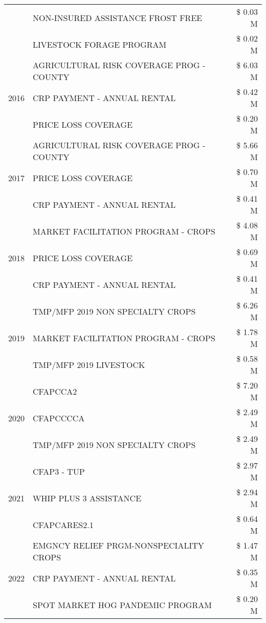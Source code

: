 \begin{tabular}{llr}
 & NON-INSURED ASSISTANCE FROST FREE & \$ 0.03 M \\
 & LIVESTOCK FORAGE PROGRAM & \$ 0.02 M \\
\cline{1-3}
\multirow[t]{3}{*}{2016} & AGRICULTURAL RISK COVERAGE PROG - COUNTY & \$ 6.03 M \\
 & CRP PAYMENT - ANNUAL RENTAL & \$ 0.42 M \\
 & PRICE LOSS COVERAGE & \$ 0.20 M \\
\cline{1-3}
\multirow[t]{3}{*}{2017} & AGRICULTURAL RISK COVERAGE PROG - COUNTY & \$ 5.66 M \\
 & PRICE LOSS COVERAGE & \$ 0.70 M \\
 & CRP PAYMENT - ANNUAL RENTAL & \$ 0.41 M \\
\cline{1-3}
\multirow[t]{3}{*}{2018} & MARKET FACILITATION PROGRAM - CROPS & \$ 4.08 M \\
 & PRICE LOSS COVERAGE & \$ 0.69 M \\
 & CRP PAYMENT - ANNUAL RENTAL & \$ 0.41 M \\
\cline{1-3}
\multirow[t]{3}{*}{2019} & TMP/MFP 2019 NON SPECIALTY CROPS & \$ 6.26 M \\
 & MARKET FACILITATION PROGRAM - CROPS & \$ 1.78 M \\
 & TMP/MFP 2019 LIVESTOCK & \$ 0.58 M \\
\cline{1-3}
\multirow[t]{3}{*}{2020} & CFAPCCA2 & \$ 7.20 M \\
 & CFAPCCCCA & \$ 2.49 M \\
 & TMP/MFP 2019 NON SPECIALTY CROPS & \$ 2.49 M \\
\cline{1-3}
\multirow[t]{3}{*}{2021} & CFAP3 - TUP & \$ 2.97 M \\
 & WHIP PLUS 3 ASSISTANCE & \$ 2.94 M \\
 & CFAPCARES2.1 & \$ 0.64 M \\
\cline{1-3}
\multirow[t]{3}{*}{2022} & EMGNCY RELIEF PRGM-NONSPECIALITY CROPS & \$ 1.47 M \\
 & CRP PAYMENT - ANNUAL RENTAL & \$ 0.35 M \\
 & SPOT MARKET HOG PANDEMIC PROGRAM & \$ 0.20 M \\
\cline{1-3}
\bottomrule
\end{tabular}
